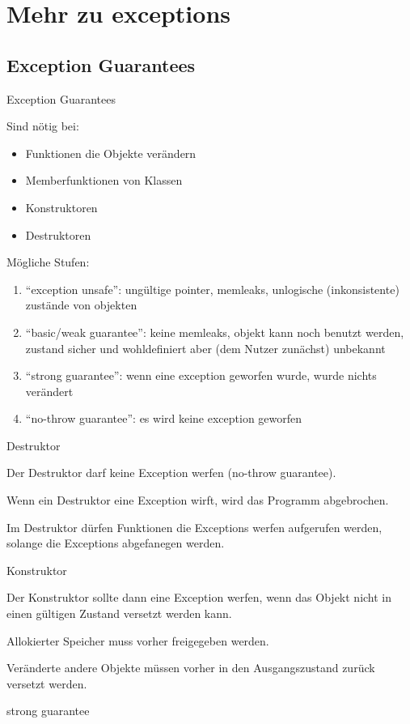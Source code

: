 \section{Mehr zu exceptions}


\subsection{Exception Guarantees}


\begin{frame}{Exception Guarantees}

    Sind nötig bei: 
	\begin{itemize}
		\item Funktionen die Objekte verändern
		\item Memberfunktionen von Klassen
		\item Konstruktoren
		\item Destruktoren
	\end{itemize}
	
	Mögliche Stufen:
	\begin{enumerate}
		\item \enquote{exception unsafe}: ungültige pointer, memleaks, unlogische (inkonsistente) zustände von objekten
		\item \enquote{basic/weak guarantee}: keine memleaks, objekt kann noch benutzt werden, zustand sicher und wohldefiniert aber (dem Nutzer zunächst) unbekannt
		\item \enquote{strong guarantee}: wenn eine exception geworfen wurde, wurde nichts verändert
		\item \enquote{no-throw guarantee}: es wird keine exception geworfen
	\end{enumerate}

\end{frame}


\begin{frame}{Destruktor}

    Der Destruktor darf keine Exception werfen (no-throw guarantee).
    
    Wenn ein Destruktor eine Exception wirft, wird das Programm abgebrochen.
    
    Im Destruktor dürfen Funktionen die Exceptions werfen aufgerufen werden, solange die Exceptions abgefanegen werden.

\end{frame}

\begin{frame}{Konstruktor}

    Der Konstruktor sollte dann eine Exception werfen, wenn das Objekt nicht in einen gültigen Zustand versetzt werden kann.
    
    Allokierter Speicher muss vorher freigegeben werden.
    
    Veränderte andere Objekte müssen vorher in den Ausgangszustand zurück versetzt werden.
    
    strong guarantee
    

\end{frame}

